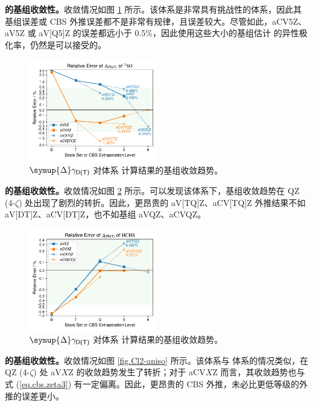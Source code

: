\textbf{ 的基组收敛性。}收敛情况如图 \ref{fig.SO-aniso} 所示。该体系是非常具有挑战性的体系，因此其基组误差或 CBS 外推误差都不是非常有规律，且误差较大。尽管如此，aCV5Z、aV5Z 或 aV[Q5]Z 的误差都远小于 0.5\%，因此使用这些大小的基组估计  的异性极化率，仍然是可以接受的。

\begin{figure}[ht]
    \centering
    \includegraphics[width=0.5\textwidth]{assets/SO-aniso.pdf}
    \caption[$\symup{\Delta} \gamma_\textsf{D(T)}$ 对体系  计算结果的基组收敛趋势]{$\symup{\Delta} \gamma_\textsf{D(T)}$ 对体系  计算结果的基组收敛趋势。}
    \label{fig.SO-aniso}
\end{figure}

\textbf{ 的基组收敛性。}收敛情况如图 \ref{fig.HCHS-aniso} 所示。可以发现该体系下，基组收敛趋势在 QZ (4-$\zeta$) 处出现了剧烈的转折。因此，更昂贵的 aV[TQ]Z、aCV[TQ]Z 外推结果不如 aV[DT]Z、aCV[DT]Z，也不如基组 aVQZ、aCVQZ。

\begin{figure}[ht]
    \centering
    \includegraphics[width=0.5\textwidth]{assets/HCHS-aniso.pdf}
    \caption[$\symup{\Delta} \gamma_\textsf{D(T)}$ 对体系  计算结果的基组收敛趋势]{$\symup{\Delta} \gamma_\textsf{D(T)}$ 对体系  计算结果的基组收敛趋势。}
    \label{fig.HCHS-aniso}
\end{figure}

\textbf{ 的基组收敛性。}收敛情况如图 \ref{fig.Cl2-aniso} 所示。该体系与  体系的情况类似，在 QZ (4-$\zeta$) 处 aV$X$Z 的收敛趋势发生了转折；对于 aCV$X$Z 而言，其收敛趋势也与式 (\ref{eq.cbs.zeta3}) 有一定偏离。因此，更昂贵的 CBS 外推，未必比更低等级的外推的误差更小。

